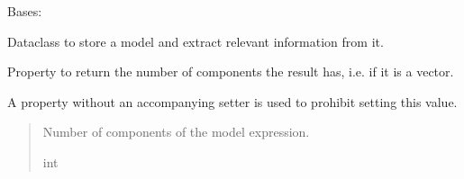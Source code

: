 \documentclass[letterpaper,10pt,english]{sphinxmanual}
\begin{document}
\begin{fulllineitems}
\label{\detokenize{VPCModel:src.VPCModel.VPCModel}}
\pysigstartsignatures
{}
\pysigstopsignatures
\sphinxAtStartPar
Bases: 

\sphinxAtStartPar
Dataclass to store a model and extract relevant information from it.

\begin{fulllineitems}
\label{\detokenize{VPCModel:src.VPCModel.VPCModel.__init__}}
\pysigstartsignatures
{}
\pysigstopsignatures
\end{fulllineitems}


\begin{fulllineitems}
\label{\detokenize{VPCModel:src.VPCModel.VPCModel.components}}
\pysigstartsignatures
{}
\pysigstopsignatures
\sphinxAtStartPar
Property to return the number of components the result has, i.e. if it is a vector.

\sphinxAtStartPar
A property without an accompanying setter is used to prohibit setting this value.
\begin{quote}\begin{description}
\sphinxAtStartPar
Number of components of the model expression.

\sphinxAtStartPar
int

\end{description}\end{quote}


\end{fulllineitems}
\end{fulllineitems}
\end{document}
